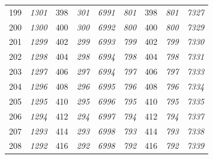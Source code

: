 \documentclass[10pt,fleqn]{article}
\begin{document}
\begin{longtable}{c|cccccccc}
199 & {\color{blue} \it 1301 \rm} & {\color{black} 398} & {\color{blue} \it 301 \rm} & {\color{blue} \it 6991 \rm} & {\color{blue} \it 801 \rm} & {\color{black} 398} & {\color{blue} \it 801 \rm} & {\color{blue} \it 7327 \rm} \\
200 & {\color{blue} \it 1300 \rm} & {\color{black} 400} & {\color{blue} \it 300 \rm} & {\color{blue} \it 6992 \rm} & {\color{blue} \it 800 \rm} & {\color{black} 400} & {\color{blue} \it 800 \rm} & {\color{blue} \it 7329 \rm} \\
201 & {\color{blue} \it 1299 \rm} & {\color{black} 402} & {\color{blue} \it 299 \rm} & {\color{blue} \it 6993 \rm} & {\color{blue} \it 799 \rm} & {\color{black} 402} & {\color{blue} \it 799 \rm} & {\color{blue} \it 7330 \rm} \\
202 & {\color{blue} \it 1298 \rm} & {\color{black} 404} & {\color{blue} \it 298 \rm} & {\color{blue} \it 6994 \rm} & {\color{blue} \it 798 \rm} & {\color{black} 404} & {\color{blue} \it 798 \rm} & {\color{blue} \it 7331 \rm} \\
203 & {\color{blue} \it 1297 \rm} & {\color{black} 406} & {\color{blue} \it 297 \rm} & {\color{blue} \it 6994 \rm} & {\color{blue} \it 797 \rm} & {\color{black} 406} & {\color{blue} \it 797 \rm} & {\color{blue} \it 7333 \rm} \\
204 & {\color{blue} \it 1296 \rm} & {\color{black} 408} & {\color{blue} \it 296 \rm} & {\color{blue} \it 6995 \rm} & {\color{blue} \it 796 \rm} & {\color{black} 408} & {\color{blue} \it 796 \rm} & {\color{blue} \it 7334 \rm} \\
205 & {\color{blue} \it 1295 \rm} & {\color{black} 410} & {\color{blue} \it 295 \rm} & {\color{blue} \it 6996 \rm} & {\color{blue} \it 795 \rm} & {\color{black} 410} & {\color{blue} \it 795 \rm} & {\color{blue} \it 7335 \rm} \\
206 & {\color{blue} \it 1294 \rm} & {\color{black} 412} & {\color{blue} \it 294 \rm} & {\color{blue} \it 6997 \rm} & {\color{blue} \it 794 \rm} & {\color{black} 412} & {\color{blue} \it 794 \rm} & {\color{blue} \it 7337 \rm} \\
207 & {\color{blue} \it 1293 \rm} & {\color{black} 414} & {\color{blue} \it 293 \rm} & {\color{blue} \it 6998 \rm} & {\color{blue} \it 793 \rm} & {\color{black} 414} & {\color{blue} \it 793 \rm} & {\color{blue} \it 7338 \rm} \\
208 & {\color{blue} \it 1292 \rm} & {\color{black} 416} & {\color{blue} \it 292 \rm} & {\color{blue} \it 6998 \rm} & {\color{blue} \it 792 \rm} & {\color{black} 416} & {\color{blue} \it 792 \rm} & {\color{blue} \it 7339 \rm} \\

\end{longtable}
\end{document}
